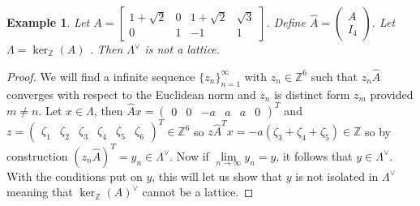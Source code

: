 \documentclass{article}
\newcommand{\Z}[0]{\mathbb{Z}}		%
\newcommand{\R}[0]{\mathbb{R}}		%
\newtheorem{ex}[thm]{Example}
\theoremstyle{definition}
\theoremstyle{remark}
\begin{document}
\begin{ex}
Let $A = \begin{bmatrix}1+\sqrt{2} & 0 & 1+\sqrt{2} & \sqrt{3} \\ 0 & 1 & -1 &1\end{bmatrix}$. Define $\hat A = \begin{pmatrix}
A \\ I_4
 \end{pmatrix}$. Let $\Lambda =  \ker_\Z(A)$ . Then $\Lambda^\vee$ is not a lattice.
\end{ex}
\begin{proof}

We will find a infinite sequence $\{z_n\}_{n=1}^\infty$ with $z_n\in \Z^6$ such that $z_n\hat A$ converges with respect to the Euclidean norm and $z_n$ is distinct form $z_m$ provided $m\neq n$. Let $x\in \Lambda$, then  $\hat Ax = \begin{pmatrix}0&0&-a&a&a&0\end{pmatrix}^T$ and $z =\begin{pmatrix}\zeta_1&\zeta_2&\zeta_3&\zeta_4&\zeta_5&\zeta_6\end{pmatrix}^T \in \Z^6$ so $z\hat A^T x = -a(\zeta_3+\zeta_4+\zeta_5)\in \Z$ so by construction $(z_n\hat A)^T = y_n\in \Lambda^\vee$. Now if $ \lim\limits_{n\to \infty} y_n= y$, it follows that $y \in \Lambda^\vee$. With the conditions put on $y$, this will let us show that $y$ is not isolated in $\Lambda^\vee$ meaning that $ \ker_\Z(A)^\vee$ cannot be a lattice.  %



\end{proof}
\end{document}
